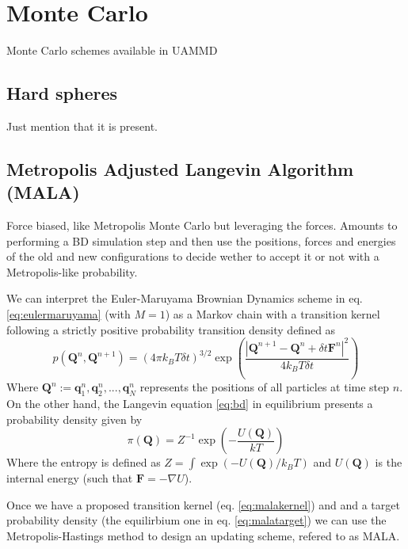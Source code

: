 \documentclass[ twoside,openright,titlepage,numbers=noenddot,%
headinclude,footinclude,cleardoublepage=empty,abstract=on,
BCOR=5mm,paper=a4,fontsize=11pt, dvipsnames
]{scrreprt}
\renewcommand{\vec}[1]{\bm{#1}}
\newcommand{\uammd}{\gls{UAMMD}\xspace}
\newcommand{\dt}{\delta t}
\newcommand{\kT}{k_B T}
\newcommand{\ppos}{q}
\begin{document}
\chapter{Monte Carlo}
Monte Carlo schemes available in \uammd

\section{Hard spheres}
Just mention that it is present.

\section{Metropolis Adjusted Langevin Algorithm (MALA)}
Force biased, like Metropolis Monte Carlo but leveraging the forces. Amounts to performing a \gls{BD} simulation step and then use the positions, forces and energies of the old and new configurations to decide wether to accept it or not with a Metropolis-like probability.

We can interpret the Euler-Maruyama Brownian Dynamics scheme in eq. \eqref{eq:eulermaruyama} (with $M=1$) as a Markov chain with a transition kernel following a strictly positive probability transition density defined as
\begin{equation}
  \label{eq:malakernel}
  p( \vec{Q}^n, \vec{Q}^{n+1}) = (4\pi \kT\dt)^{3/2}\exp\left(\frac{\left|\vec{Q}^{n+1} - \vec{Q}^n + \dt\vec{F}^n\right|^2}{4\kT\dt}\right)
\end{equation}
Where $\vec{Q}^n:={\vec{\ppos}_1^n, \vec{\ppos}^n_2, ..., \vec{\ppos}^n_N}$ represents the positions of all particles at time step $n$.
On the other hand, the Langevin equation \eqref{eq:bd} in equilibrium presents a probability density given by
\begin{equation}
  \label{eq:malatarget}
  \pi(\vec{Q}) = Z^{-1}\exp\left(-\frac{U(\vec{Q})}{kT}\right)
\end{equation}
Where the entropy is defined as $Z = \int\exp\left(-U(\vec{Q})/\kT\right)$ and $U(\vec{Q})$ is the internal energy (such that $\vec{F} = -\nabla U$).

Once we have a proposed transition kernel (eq. \eqref{eq:malakernel}) and and a target probability density (the equilirbium one in eq. \eqref{eq:malatarget}) we can use the Metropolis-Hastings method to design an updating scheme, refered to as MALA\cite{Roberts1996}\cite{Besag1994}.
\end{document}
